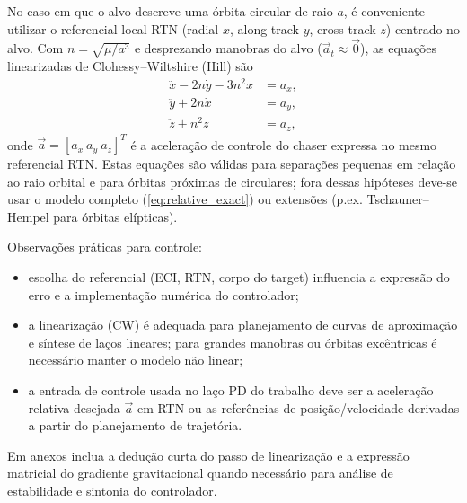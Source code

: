 No caso em que o alvo descreve uma órbita circular de raio $a$, é conveniente utilizar o referencial local RTN (radial $x$, along-track $y$, cross-track $z$) centrado no alvo. Com $n=\sqrt{\mu/a^{3}}$ e desprezando manobras do alvo ($\vec{a}_t\approx\vec{0}$), as equações linearizadas de Clohessy–Wiltshire (Hill) são
\begin{equation}
\begin{aligned}
\ddot{x} - 2n\dot{y} - 3n^{2}x &= a_x,\\[4pt]
\ddot{y} + 2n\dot{x} &= a_y,\\[4pt]
\ddot{z} + n^{2}z &= a_z,
\end{aligned}
\label{eq:cw_equations}
\end{equation}
onde $\vec{a}=[a_x\ a_y\ a_z]^{T}$ é a aceleração de controle do chaser expressa no mesmo referencial RTN. Estas equações são válidas para separações pequenas em relação ao raio orbital e para órbitas próximas de circulares; fora dessas hipóteses deve-se usar o modelo completo (\ref{eq:relative_exact}) ou extensões (p.ex. Tschauner–Hempel para órbitas elípticas).

Observações práticas para controle:
\begin{itemize}
  \item escolha do referencial (ECI, RTN, corpo do target) influencia a expressão do erro e a implementação numérica do controlador;
  \item a linearização (CW) é adequada para planejamento de curvas de aproximação e síntese de laços lineares; para grandes manobras ou órbitas excêntricas é necessário manter o modelo não linear;
  \item a entrada de controle usada no laço PD do trabalho deve ser a aceleração relativa desejada $\vec{a}$ em RTN ou as referências de posição/velocidade derivadas a partir do planejamento de trajetória.
\end{itemize}

Em anexos inclua a dedução curta do passo de linearização e a expressão matricial do gradiente gravitacional quando necessário para análise de estabilidade e sintonia do controlador.





















